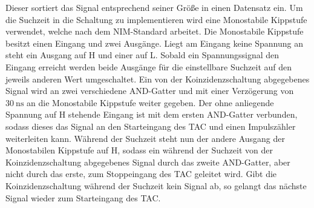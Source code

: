 Dieser sortiert das Signal entsprechend seiner Größe in einen Datensatz ein.
Um die Suchzeit in die Schaltung zu implementieren wird eine Monostabile Kippstufe verwendet, welche nach dem NIM-Standard arbeitet.
Die Monostabile Kippstufe besitzt einen Eingang und zwei Ausgänge.
Liegt am Eingang keine Spannung an steht ein Ausgang auf H und einer auf L.
Sobald ein Spannungssignal den Eingang erreicht werden beide Ausgänge für die einstellbare Suchzeit auf den jeweils anderen Wert umgeschaltet.
Ein von der Koinzidenzschaltung abgegebenes Signal wird an zwei verschiedene AND-Gatter und mit einer Verzögerung von $\SI{30}{\nano\second}$ an die Monostabile Kippstufe weiter gegeben.
Der ohne anliegende Spannung auf H stehende Eingang ist mit dem ersten AND-Gatter verbunden, sodass dieses das Signal an den Starteingang des TAC und einen Impulszähler weiterleiten kann.
Während der Suchzeit steht nun der andere Ausgang der Monostabilen Kippstufe auf H, sodass ein während der Suchzeit von der Koinzidenzschaltung abgegebenes Signal durch das zweite AND-Gatter, aber nicht durch das erste, zum Stoppeingang des TAC geleitet wird.
Gibt die Koinzidenzschaltung während der Suchzeit kein Signal ab, so gelangt das nächste Signal wieder zum Starteingang des TAC.

\cite{sample}
